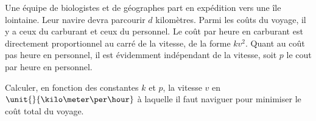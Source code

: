 \begin{exercice}\label{exoTP40005}

	Une équipe de biologistes et de géographes part en expédition vers une île lointaine. Leur navire devra parcourir $d$ kilomètres. Parmi les coûts du voyage, il y a ceux du carburant et ceux du personnel. Le coût par heure en carburant est directement proportionnel au carré de la vitesse, de la forme $kv^2$. Quant au coût pas heure en personnel, il est évidemment indépendant de la vitesse, soit $p$ le cout par heure en personnel.

	Calculer, en fonction des constantes $k$ et $p$, la vitesse $v$ en $\unit{}{\kilo\meter\per\hour}$ à laquelle il faut naviguer pour minimiser le coût total du voyage.

\end{exercice}
